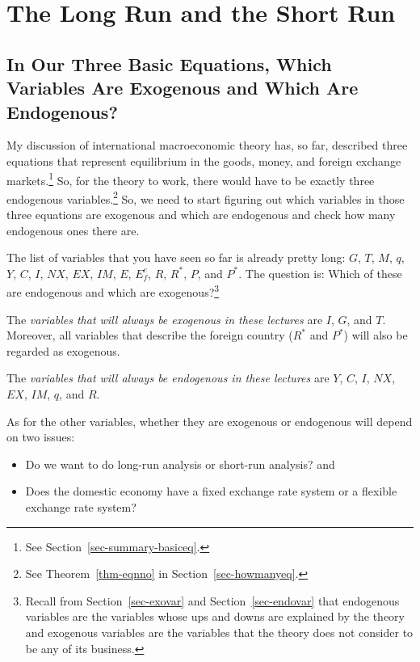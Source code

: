 \documentclass[
  letterpaper,
]{book}
\providecommand{\tightlist}{%
  \setlength{\itemsep}{0pt}\setlength{\parskip}{0pt}}\usepackage{longtable,booktabs,array}
\theoremstyle{plain}
\theoremstyle{remark}
\begin{document}

\chapter{The Long Run and the Short Run}\label{sec-shortlong}

\section{In Our Three Basic Equations, Which Variables Are Exogenous and
Which Are Endogenous?}\label{sec-exoendo}

My discussion of international macroeconomic theory has, so far,
described three equations that represent equilibrium in the goods,
money, and foreign exchange markets.\footnote{See
  Section~\ref{sec-summary-basiceq}.} So, for the theory to work, there
would have to be exactly three endogenous variables.\footnote{See
  Theorem~\ref{thm-eqnno} in Section~\ref{sec-howmanyeq}.} So, we need
to start figuring out which variables in those three equations are
exogenous and which are endogenous and check how many endogenous ones
there are.

The list of variables that you have seen so far is already pretty long:
\(G\), \(T\), \(M\), \(q\), \(Y\), \(C\), \(I\), \(NX\), \(EX\), \(IM\),
\(E\), \(E^e_f\), \(R\), \(R^*\), \(P\), and \(P^*\). The question is:
Which of these are endogenous and which are exogenous?\footnote{Recall
  from Section~\ref{sec-exovar} and Section~\ref{sec-endovar} that
  endogenous variables are the variables whose ups and downs are
  explained by the theory and exogenous variables are the variables that
  the theory does not consider to be any of its business.}

The \emph{variables that will always be exogenous in these lectures} are
\(I\), \(G\), and \(T\). Moreover, all variables that describe the
foreign country (\(R^*\) and \(P^*\)) will also be regarded as
exogenous.

The \emph{variables that will always be endogenous in these lectures}
are \(Y\), \(C\), \(I\), \(NX\), \(EX\), \(IM\), \(q\), and \(R\).

As for the other variables, whether they are exogenous or endogenous
will depend on two issues:

\begin{itemize}
\tightlist
\item
  Do we want to do long-run analysis or short-run analysis? and
\item
  Does the domestic economy have a fixed exchange rate system or a
  flexible exchange rate system?
\end{itemize}
\end{document}
